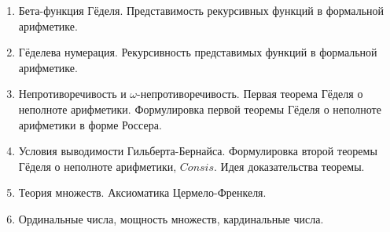 \documentclass[11pt,a4paper,oneside]{scrartcl}
\begin{document}
\begin{enumerate}
\item Бета-функция Гёделя. Представимость рекурсивных функций в формальной арифметике.
\item Гёделева нумерация. Рекурсивность представимых функций в формальной арифметике.
\item Непротиворечивость и $\omega$-непротиворечивость. Первая теорема Гёделя о неполноте арифметики.
Формулировка первой теоремы Гёделя о неполноте арифметики в форме Россера.
\item Условия выводимости Гильберта-Бернайса. Формулировка второй теоремы Гёделя о неполноте арифметики, 
$Consis$. Идея доказательства теоремы.
\item Теория множеств. Аксиоматика Цермело-Френкеля.
\item Ординальные числа, мощность множеств, кардинальные числа. 
\end{enumerate}
\end{document}
